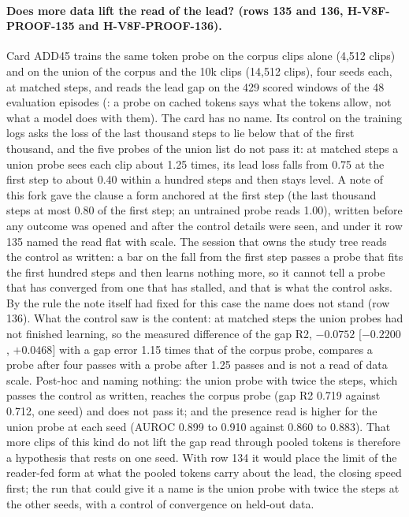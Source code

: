 \paragraph{Does more data lift the read of the lead? (rows 135 and 136, H-V8F-PROOF-135 and H-V8F-PROOF-136).} Card ADD45 trains the same token probe on the corpus clips alone (4,512 clips) and on the union of the corpus and the 10k clips (14,512 clips), four seeds each, at matched steps, and reads the lead gap on the 429 scored windows of the 48 evaluation episodes (: a probe on cached tokens says what the tokens allow, not what a model does with them). The card has no name. Its control on the training logs asks the loss of the last thousand steps to lie below that of the first thousand, and the five probes of the union list do not pass it: at matched steps a union probe sees each clip about 1.25 times, its lead loss falls from 0.75 at the first step to about 0.40 within a hundred steps and then stays level. A note of this fork gave the clause a form anchored at the first step (the last thousand steps at most 0.80 of the first step; an untrained probe reads 1.00), written before any outcome was opened and after the control details were seen, and under it row 135 named the read flat with scale. The session that owns the study tree reads the control as written: a bar on the fall from the first step passes a probe that fits the first hundred steps and then learns nothing more, so it cannot tell a probe that has converged from one that has stalled, and that is what the control asks. By the rule the note itself had fixed for this case the name does not stand (row 136). What the control saw is the content: at matched steps the union probes had not finished learning, so the measured difference of the gap R2, $-0.0752$ [$-0.2200$, $+0.0468$] with a gap error 1.15 times that of the corpus probe, compares a probe after four passes with a probe after 1.25 passes and is not a read of data scale. Post-hoc and naming nothing: the union probe with twice the steps, which passes the control as written, reaches the corpus probe (gap R2 0.719 against 0.712, one seed) and does not pass it; and the presence read is higher for the union probe at each seed (AUROC 0.899 to 0.910 against 0.860 to 0.883). That more clips of this kind do not lift the gap read through pooled tokens is therefore a hypothesis that rests on one seed. With row 134 it would place the limit of the reader-fed form at what the pooled tokens carry about the lead, the closing speed first; the run that could give it a name is the union probe with twice the steps at the other seeds, with a control of convergence on held-out data.

